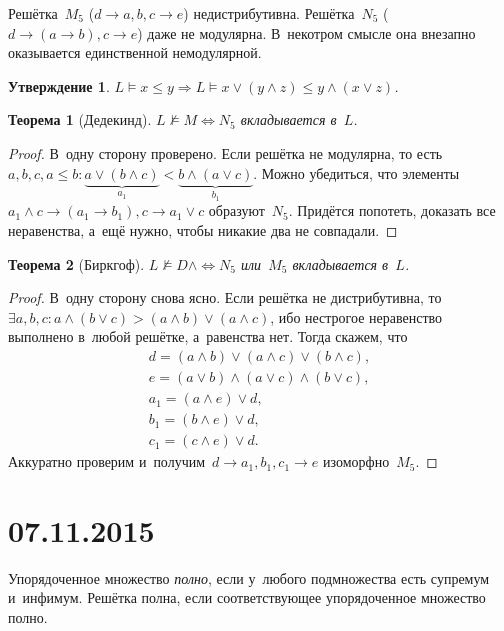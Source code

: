 \documentclass{article}
\newtheorem{theorem}{Теорема}
\newtheorem{claim}{Утверждение}
\renewcommand{\le}{\leqslant}
\begin{document}
Решётка~$M_5$ ($d \rightarrow a, b, c \rightarrow e$) недистрибутивна.
Решётка~$N_5$ ($d \rightarrow (a \rightarrow b), c \rightarrow e$) даже не
модулярна. В~некотром смысле она внезапно оказывается единственной немодулярной.

\begin{claim}
  $L \models x \le y \Rightarrow L \models x \lor (y \land z) \le y \land (x
  \lor z)$.
\end{claim}

\begin{theorem}[Дедекинд]
  $L \not\models M \Longleftrightarrow N_5$ вкладывается в~$L$.
\end{theorem}
\begin{proof}
  В~одну сторону проверено. Если решётка не модулярна, то есть~$a, b, c, a \le
  b: \underbrace{a \lor (b \land c)}_{a_1} < \underbrace{b \land (a \lor
  c)}_{b_1}$. Можно убедиться, что элементы~$a_1 \land c \rightarrow (a_1
  \rightarrow b_1), c \rightarrow a_1 \lor c$ образуют~$N_5$.
  Придётся попотеть, доказать все неравенства, а~ещё нужно, чтобы никакие два
  не совпадали.
\end{proof}

\begin{theorem}[Биркгоф]
  $L \not\models D\land \Longleftrightarrow N_5$ или~$M_5$ вкладывается в~$L$.
\end{theorem}
\begin{proof}
  В~одну сторону снова ясно. Если решётка не дистрибутивна, то~$\exists a, b, c:
  a \land (b \lor c) > (a \land b) \lor (a \land c)$, ибо нестрогое неравенство
  выполнено в~любой решётке, а~равенства нет. Тогда скажем, что
  \begin{gather*}
    d = (a \land b) \lor (a \land c) \lor (b \land c),\\
    e = (a \lor b) \land (a \lor c) \land (b \lor c),\\
    a_1 = (a \land e) \lor d,\\
    b_1 = (b \land e) \lor d,\\
    c_1 = (c \land e) \lor d.
  \end{gather*}
  Аккуратно проверим и~получим~$d \rightarrow a_1, b_1, c_1 \rightarrow e$
  изоморфно~$M_5$.
\end{proof}

\section*{07.11.2015}

Упорядоченное множество \emph{полно}, если у~любого подмножества есть супремум
и~инфимум. Решётка полна, если соответствующее упорядоченное множество полно.
\end{document}

